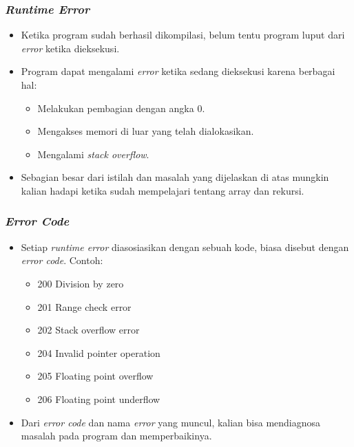 \documentclass{beamer}
\begin{document}
\begin{frame}
\frametitle{\textit{Runtime Error}}
\begin{itemize}
	\item Ketika program sudah berhasil dikompilasi, belum tentu program luput dari \textit{error} ketika dieksekusi.
	\item Program dapat mengalami \textit{error} ketika sedang dieksekusi karena berbagai hal:
	\begin{itemize}
		\item Melakukan pembagian dengan angka 0.
		\item Mengakses memori di luar yang telah dialokasikan.
		\item Mengalami \textit{stack overflow}.
	\end{itemize}
	\item Sebagian besar dari istilah dan masalah yang dijelaskan di atas mungkin kalian hadapi ketika sudah mempelajari tentang array dan rekursi.
\end{itemize}
\end{frame}

\begin{frame}
\frametitle{\textit{Error Code}}
\begin{itemize}
	\item Setiap \textit{runtime error} diasosiasikan dengan sebuah kode, biasa disebut dengan \alert{\textit{error code}}. Contoh:
	\begin{itemize}
		\item 200 Division by zero
		\item 201 Range check error
		\item 202 Stack overflow error
		\item 204 Invalid pointer operation
		\item 205 Floating point overflow
		\item 206 Floating point underflow 
	\end{itemize}
	\item Dari \textit{error code} dan nama \textit{error} yang muncul, kalian bisa mendiagnosa masalah pada program dan memperbaikinya.
\end{itemize}
\end{frame}
\end{document}
